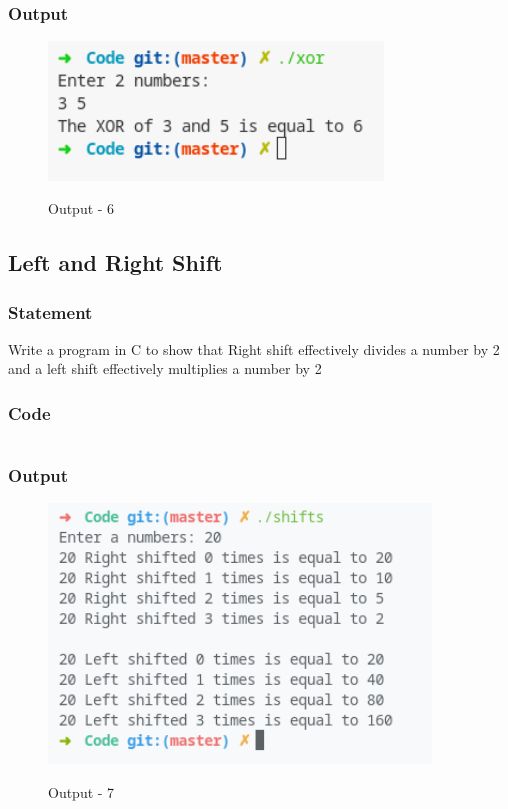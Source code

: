 \subsubsection{Output}
\begin{figure}[!htb]
  \centering
  \includegraphics[width=3.5in]{Images/xor.png}
  \label{Output-6}
  \caption{Output - 6}
\end{figure}


\pagebreak
\subsection{Left and Right Shift}

\subsubsection{Statement}
Write a program in C to show that Right shift effectively divides a number by 2 and a left shift
effectively multiplies a number by 2

\subsubsection{Code}
\inputminted[]{c}{../Code/shifts.cpp}
\subsubsection{Output}
\begin{figure}[H]
  \centering
  \includegraphics[width=4in]{Images/shifts.png}
  \label{Output-7}
  \caption{Output - 7}
\end{figure}


